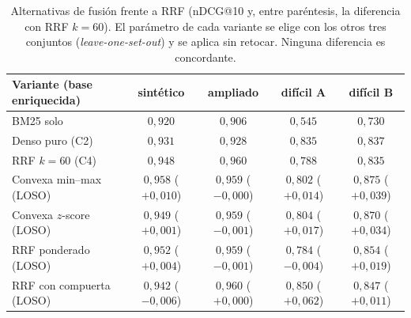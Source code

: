 \begin{table}[htbp]
\centering
\footnotesize
\setlength{\tabcolsep}{5pt}
\renewcommand{\arraystretch}{1.25}
\caption{Alternativas de fusión frente a RRF (nDCG@10 y, entre paréntesis, la diferencia con RRF $k=60$). El parámetro de cada variante se elige con los otros tres conjuntos (\textit{leave-one-set-out}) y se aplica sin retocar. Ninguna diferencia es concordante.}
\label{tab:fusion}
\begin{tabularx}{\textwidth}{@{}l C C C C@{}}
\toprule
\textbf{Variante (base enriquecida)} & \textbf{sintético} & \textbf{ampliado} & \textbf{difícil A} & \textbf{difícil B} \\
\midrule
BM25 solo & $0{,}920$ & $0{,}906$ & $0{,}545$ & $0{,}730$ \\
Denso puro (C2) & $0{,}931$ & $0{,}928$ & $0{,}835$ & $0{,}837$ \\
RRF $k=60$ (C4) & $0{,}948$ & $0{,}960$ & $0{,}788$ & $0{,}835$ \\
Convexa min--max (LOSO) & $0{,}958$ ($+0{,}010$) & $0{,}959$ ($-0{,}000$) & $0{,}802$ ($+0{,}014$) & $0{,}875$ ($+0{,}039$) \\
Convexa $z$-score (LOSO) & $0{,}949$ ($+0{,}001$) & $0{,}959$ ($-0{,}001$) & $0{,}804$ ($+0{,}017$) & $0{,}870$ ($+0{,}034$) \\
RRF ponderado (LOSO) & $0{,}952$ ($+0{,}004$) & $0{,}959$ ($-0{,}001$) & $0{,}784$ ($-0{,}004$) & $0{,}854$ ($+0{,}019$) \\
RRF con compuerta (LOSO) & $0{,}942$ ($-0{,}006$) & $0{,}960$ ($+0{,}000$) & $0{,}850$ ($+0{,}062$) & $0{,}847$ ($+0{,}011$) \\
\bottomrule
\end{tabularx}
\end{table}

